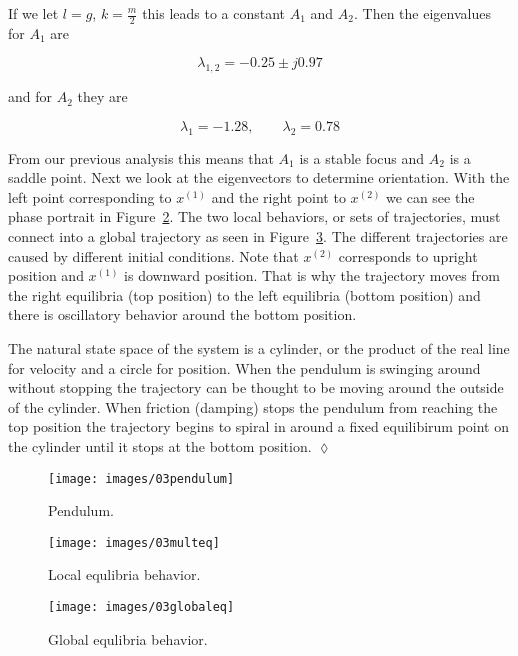 \begin{example}
If we let $l=g$, $k=\tfrac{m}{2}$ this leads to a constant $A_1$ and $A_2$.
Then the eigenvalues for $A_1$ are

\begin{equation*}
\lambda_{1,2} = -0.25\pm{} j0.97
\end{equation*}

and for $A_2$ they are

\begin{equation*}
\lambda_1 = -1.28, \qquad \lambda_2 = 0.78
\end{equation*}

From our previous analysis this means that $A_1$ is a stable focus and $A_2$ is a saddle point.
Next we look at the eigenvectors to determine orientation.
With the left point corresponding to $x^{(1)}$ and the right point to $x^{(2)}$ we can see the phase portrait in Figure~\ref{fig:03multeq}.
The two local behaviors, or sets of trajectories, must connect into a global trajectory as seen in Figure~\ref{fig:03globaleq}.
The different trajectories are caused by different initial conditions.
Note that $x^{(2)}$ corresponds to upright position and $x^{(1)}$ is downward position.
That is why the trajectory moves from the right equilibria (top position) to the left equilibria (bottom position) and there is oscillatory behavior around the bottom position.

The natural state space of the system is a cylinder, or the product of the real line for velocity and a circle for position.
When the pendulum is swinging around without stopping the trajectory can be thought to be moving around the outside of the cylinder.
When friction (damping) stops the pendulum from reaching the top position the trajectory begins to spiral in around a fixed equilibirum point on the cylinder until it stops at the bottom position.
$\lozenge$
\end{example}

\begin{figure}[ht!]
\centering
\texttt{[image: images/03pendulum]}
\caption{Pendulum.}%
\label{fig:03pendulum}
\end{figure}

\begin{figure}[ht!]
\centering
\texttt{[image: images/03multeq]}
\caption{Local equlibria behavior.}%
\label{fig:03multeq}
\end{figure}

\begin{figure}[ht!]
\centering
\texttt{[image: images/03globaleq]}
\caption{Global equlibria behavior.}%
\label{fig:03globaleq}
\end{figure}


